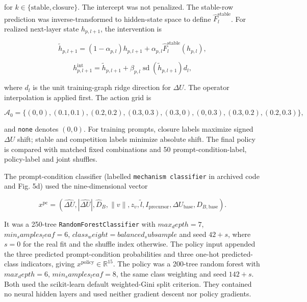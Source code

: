 \documentclass[10pt]{article}
\begin{document}
for \(k\in\{\mathrm{stable},\mathrm{closure}\}\). The intercept was not penalized. The stable-row prediction was inverse-transformed to hidden-state space to define \(\hat F_l^{\mathrm{stable}}\). For realized next-layer state \(h_{p,l+1}\), the intervention is

\begin{equation*}
\tilde h_{p,l+1}=(1-\alpha_{p,l})h_{p,l+1}+\alpha_{p,l}\hat F_l^{\mathrm{stable}}(h_{p,l}),
\end{equation*}

\begin{equation*}
h_{p,l+1}^{\mathrm{int}}=\tilde h_{p,l+1}+\beta_{p,l}\operatorname{sd}(\tilde h_{p,l+1})d_l,
\end{equation*}

where \(d_l\) is the unit training-graph ridge direction for \(\Delta U\). The operator interpolation is applied first. The action grid is

\begin{equation*}
\mathcal A_0=\{(0,0),(0.1,0.1),(0.2,0.2),(0.3,0.3),
(0.3,0),(0,0.3),(0.3,0.2),(0.2,0.3)\},
\end{equation*}

and \texttt{none} denotes \((0,0)\). For training prompts, closure labels maximize signed \(\Delta U\) shift; stable and competition labels minimize absolute shift. The final policy is compared with matched fixed combinations and 50 prompt-condition-label, policy-label and joint shuffles.

The prompt-condition classifier (labelled \texttt{mechanism classifier} in archived code and Fig. 5d) used the nine-dimensional vector

\begin{equation*}
x^{\mathrm{pc}}=(\widehat{\Delta U},|\widehat{\Delta U}|,\widehat D_B,\lVert v\rVert,z_v,\tilde l,I_{\mathrm{precursor}},\Delta U_{\mathrm{base}},D_{B,\mathrm{base}}).
\end{equation*}

It was a 250-tree \texttt{RandomForestClassifier} with \(max_depth=7\), \(min_samples_leaf=6\), \(class_weight=balanced_subsample\) and seed \(42+s\), where \(s=0\) for the real fit and the shuffle index otherwise. The policy input appended the three predicted prompt-condition probabilities and three one-hot predicted-class indicators, giving \(x^{\mathrm{policy}}\in\mathbb R^{15}\). The policy was a 200-tree random forest with \(max_depth=6\), \(min_samples_leaf=8\), the same class weighting and seed \(142+s\). Both used the scikit-learn default weighted-Gini split criterion. They contained no neural hidden layers and used neither gradient descent nor policy gradients.
\end{document}
